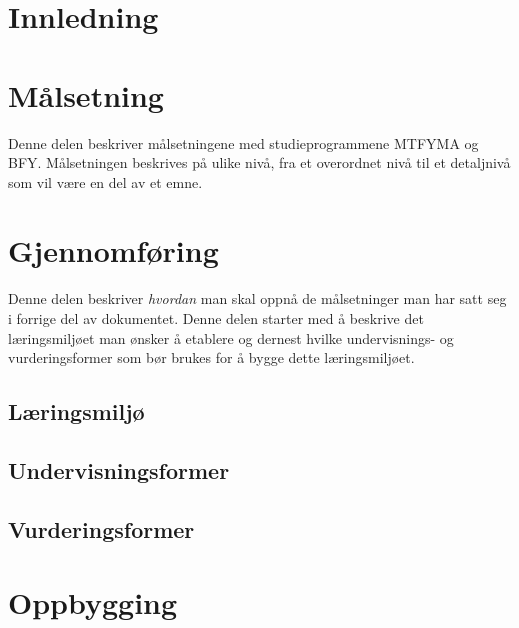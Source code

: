 \documentclass[a4paper, oneside, 12pt]{memoir}
\begin{document}
\frontmatter
\tableofcontents
{}

\part{Innledning}

\mainmatter



\part{Målsetning}
\label{part:goals}

Denne delen beskriver målsetningene med studieprogrammene MTFYMA og BFY. Målsetningen beskrives på ulike nivå, fra et overordnet nivå til et detaljnivå som vil være en del av et emne.








\part{Gjennomføring}
\label{part:tla}

Denne delen beskriver \emph{hvordan} man skal oppnå de målsetninger man har satt seg i forrige del av dokumentet. Denne delen starter med å beskrive det læringsmiljøet man ønsker å etablere og dernest hvilke undervisnings- og vurderingsformer som bør brukes for å bygge dette læringsmiljøet.

	\chapter{Læringsmiljø}
	
	\chapter{Undervisningsformer}
	
	\chapter{Vurderingsformer}

\part{Oppbygging}
\label{part:program-structure}
\end{document}
